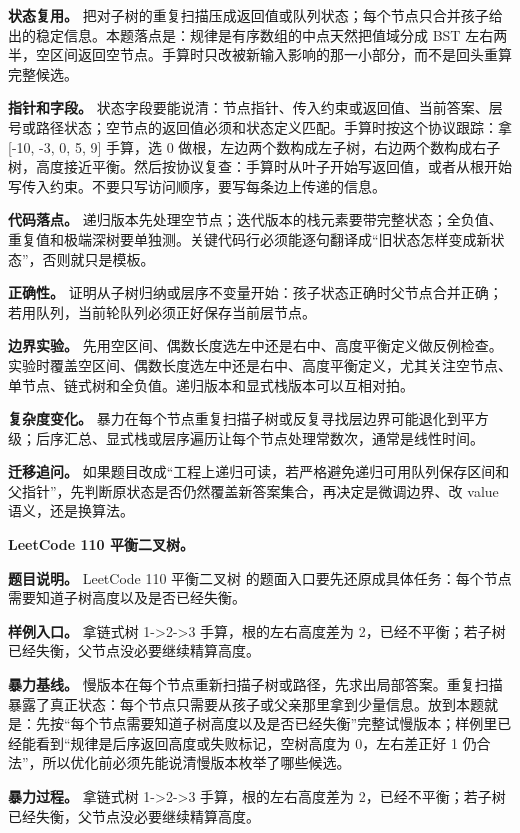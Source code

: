 \textbf{状态复用。} 把对子树的重复扫描压成返回值或队列状态；每个节点只合并孩子给出的稳定信息。本题落点是：规律是有序数组的中点天然把值域分成 BST 左右两半，空区间返回空节点。手算时只改被新输入影响的那一小部分，而不是回头重算完整候选。

\textbf{指针和字段。} 状态字段要能说清：节点指针、传入约束或返回值、当前答案、层号或路径状态；空节点的返回值必须和状态定义匹配。手算时按这个协议跟踪：拿 [-10, -3, 0, 5, 9] 手算，选 0 做根，左边两个数构成左子树，右边两个数构成右子树，高度接近平衡。然后按协议复查：手算时从叶子开始写返回值，或者从根开始写传入约束。不要只写访问顺序，要写每条边上传递的信息。

\textbf{代码落点。} 递归版本先处理空节点；迭代版本的栈元素要带完整状态；全负值、重复值和极端深树要单独测。关键代码行必须能逐句翻译成“旧状态怎样变成新状态”，否则就只是模板。

\textbf{正确性。} 证明从子树归纳或层序不变量开始：孩子状态正确时父节点合并正确；若用队列，当前轮队列必须正好保存当前层节点。

\textbf{边界实验。} 先用空区间、偶数长度选左中还是右中、高度平衡定义做反例检查。实验时覆盖空区间、偶数长度选左中还是右中、高度平衡定义，尤其关注空节点、单节点、链式树和全负值。递归版本和显式栈版本可以互相对拍。

\textbf{复杂度变化。} 暴力在每个节点重复扫描子树或反复寻找层边界可能退化到平方级；后序汇总、显式栈或层序遍历让每个节点处理常数次，通常是线性时间。

\textbf{迁移追问。} 如果题目改成“工程上递归可读，若严格避免递归可用队列保存区间和父指针”，先判断原状态是否仍然覆盖新答案集合，再决定是微调边界、改 value 语义，还是换算法。

\noindent\textbf{LeetCode 110 平衡二叉树。}

\textbf{题目说明。} LeetCode 110 平衡二叉树 的题面入口要先还原成具体任务：每个节点需要知道子树高度以及是否已经失衡。

\textbf{样例入口。} 拿链式树 1->2->3 手算，根的左右高度差为 2，已经不平衡；若子树已经失衡，父节点没必要继续精算高度。

\textbf{暴力基线。} 慢版本在每个节点重新扫描子树或路径，先求出局部答案。重复扫描暴露了真正状态：每个节点只需要从孩子或父亲那里拿到少量信息。放到本题就是：先按“每个节点需要知道子树高度以及是否已经失衡”完整试慢版本；样例里已经能看到“规律是后序返回高度或失败标记，空树高度为 0，左右差正好 1 仍合法”，所以优化前必须先能说清慢版本枚举了哪些候选。

\textbf{暴力过程。} 拿链式树 1->2->3 手算，根的左右高度差为 2，已经不平衡；若子树已经失衡，父节点没必要继续精算高度。

